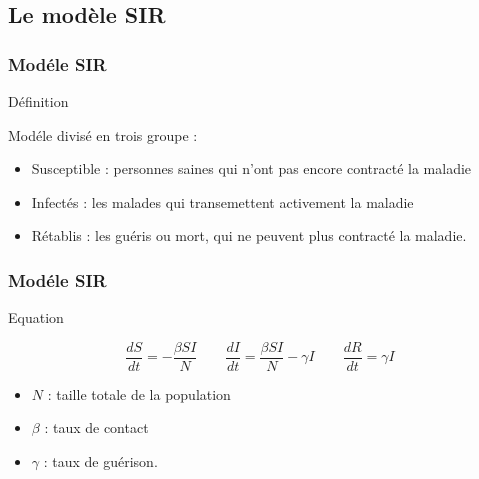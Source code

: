 \subsection{Le modèle SIR}

\begin{frame}
        \frametitle{Modéle SIR}

        \begin{block}{Définition}

                Modéle divisé en trois groupe :
                \begin{itemize}
                        \item Susceptible : personnes saines qui n'ont pas encore contracté la maladie
                        \item Infectés : les malades qui transemettent activement la maladie
                        \item Rétablis : les guéris ou mort, qui ne peuvent plus contracté la maladie.
                \end{itemize}

        \end{block}
\end{frame}

\begin{frame}
        \frametitle{Modéle SIR}

        \begin{alertblock}{Equation}

                $$ \frac{dS}{dt} = -\frac{\beta SI}{N} \qquad \frac{dI}{dt} = \frac{\beta SI}{N} - \gamma I \qquad \frac{dR}{dt} = \gamma I $$

                \begin{itemize}
                        \item $N$ : taille totale de la population
                        \item $\beta$ : taux de contact
                        \item $\gamma$ : taux de guérison.
                \end{itemize}

        \end{alertblock}
\end{frame}

